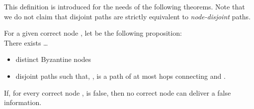 \documentclass[a4paper,11pt]{article}
\begin{document}
This definition is introduced for the needs of the following theorems. Note that we do not claim that disjoint paths are strictly equivalent to \emph{node-disjoint} paths.


\begin{theorem}

\label{thsafe}
For a given correct node , let  be the following proposition: \\There exists \dots
\begin{itemize}
\item  distinct Byzantine nodes 
\item  disjoint paths  such that, ,  is a path of at most  hops connecting  and .
\end{itemize}

If, for every correct node ,  is false, then no correct node can deliver a false information.
\end{theorem}
\end{document}

